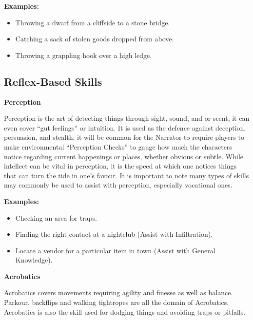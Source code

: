 \begin{displayquote}
    \textbf{Examples:}
    \begin{itemize}
        \item Throwing a dwarf from a cliffside to a stone bridge.
        \item Catching a sack of stolen goods dropped from above.
        \item Throwing a grappling hook over a high ledge.
    \end{itemize}
\end{displayquote}

\subsection{Reflex-Based Skills} \label{subsec:reflex-based_skills}

\textbf{Perception}

Perception is the art of detecting things through sight, sound, and or scent, it can even cover “gut feelings” or intuition. It is used as the defence against deception, persuasion, and stealth; it will be common for the Narrator to require players to make environmental “Perception Checks” to gauge how much the characters notice regarding current happenings or places, whether obvious or subtle. While intellect can be vital in perception, it is the speed at which one notices things that can turn the tide in one’s favour. It is important to note many types of skills may commonly be used to assist with perception, especially vocational ones.

\begin{displayquote}
    \textbf{Examples:}
    \begin{itemize}
        \item Checking an area for traps.
        \item Finding the right contact at a nightclub (Assist with Infiltration).
        \item Locate a vendor for a particular item in town (Assist with General Knowledge).
    \end{itemize}
\end{displayquote}

\textbf{Acrobatics}

Acrobatics covers movements requiring agility and finesse as well as balance. Parkour, backflips and walking tightropes are all the domain of Acrobatics. Acrobatics is also the skill used for dodging things and avoiding traps or pitfalls.

